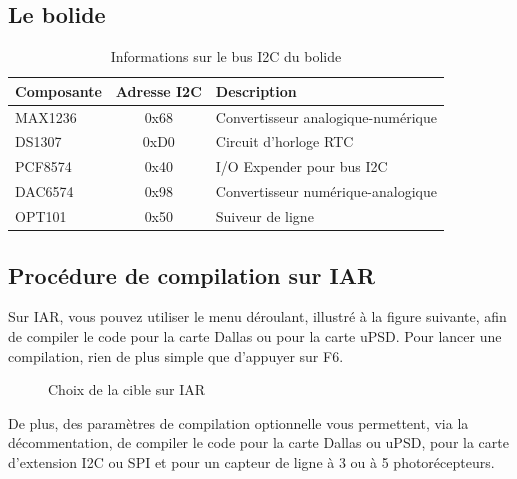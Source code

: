 \documentclass[10pt,a4paper,final]{article}
\begin{document}
\begin{spacing}{1.5}
\subsection{Le bolide}
\begin{table}[!ht]
\centering
\begin{tabular}{|l|c|l|}
\hline 
\textbf{Composante} & \textbf{Adresse I{\small 2}C} & \textbf{Description} \\ 
\hline 
MAX1236 & 0x68 & Convertisseur analogique-numérique \\ 
\hline 
DS1307  & 0xD0 & Circuit d'horloge RTC \\ 
\hline 
PCF8574 & 0x40 & I/O Expender pour bus I{\small 2}C \\ 
\hline 
DAC6574 & 0x98  & Convertisseur numérique-analogique  \\ 
\hline 
OPT101  &  0x50 & Suiveur de ligne  \\ 
\hline 
\end{tabular} 
\caption{Informations sur le bus I{\small 2}C du bolide}
\label{tab:testtab1}
\end{table}

\pagebreak
\subsection{Procédure de compilation sur IAR}
Sur IAR, vous pouvez utiliser le menu déroulant, illustré à la figure suivante, afin de compiler le code pour la carte Dallas ou pour la carte uPSD. Pour lancer une compilation, rien de plus simple que d'appuyer sur F6.

\begin{figure}[hbtp]
\caption{Choix de la cible sur IAR}
\centering
{}
\end{figure}

De plus, des paramètres de compilation optionnelle vous permettent, via la décommentation, de compiler le code pour la carte Dallas ou uPSD, pour la carte d'extension I2C ou SPI et pour un capteur de ligne à 3 ou à 5 photorécepteurs.\\
\end{spacing}
\end{document}

